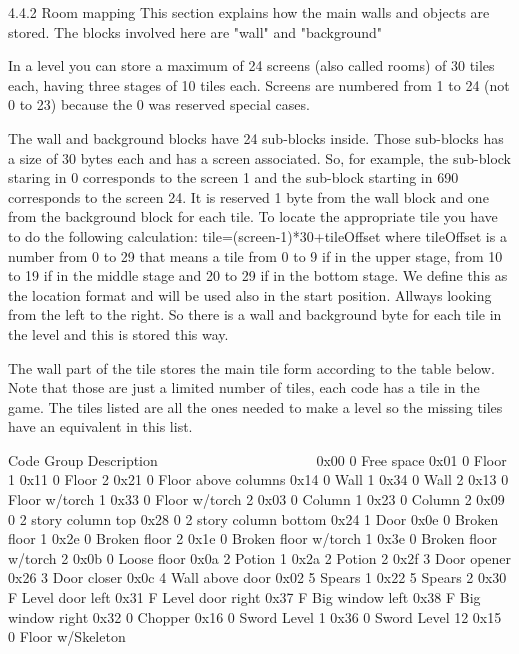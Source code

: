 4.4.2 Room mapping
 This section explains how the main walls and objects are stored. The
 blocks involved here are "wall" and "background"

 In a level you can store a maximum of 24 screens (also called rooms) of 30
 tiles each, having three stages of 10 tiles each. Screens are numbered from
 1 to 24 (not 0 to 23) because the 0 was reserved special cases.

 The wall and background blocks have 24 sub-blocks inside. Those sub-blocks
 has a size of 30 bytes each and has a screen associated. So, for example,
 the sub-block staring in 0 corresponds to the screen 1 and the sub-block
 starting in 690 corresponds to the screen 24. 
 It is reserved 1 byte from the wall block and one from the background block
 for each tile. To locate the appropriate tile you have to do the following
 calculation: tile=(screen-1)*30+tileOffset where tileOffset is a number
 from 0 to 29 that means a tile from 0 to 9 if in the upper stage, from
 10 to 19 if in the middle stage and 20 to 29 if in the bottom stage.
 We define this as the location format and will be used also in the start
 position.
 Allways looking from the left to the right.
 So there is a wall and background byte for each tile in the level and this
 is stored this way.

 The wall part of the tile stores the main tile form according to the table
 below. Note that those are just a limited number of tiles, each code has a
 tile in the game. The tiles listed are all the ones needed to make a level
 so the missing tiles have an equivalent in this list.

  Code Group Description
  ~~~~ ~~~~~ ~~~~~~~~~~~
  0x00 0     Free space
  0x01 0     Floor 1
  0x11 0     Floor 2
  0x21 0     Floor above columns
  0x14 0     Wall 1
  0x34 0     Wall 2
  0x13 0     Floor w/torch 1  
  0x33 0     Floor w/torch 2     
  0x03 0     Column 1   
  0x23 0     Column 2   
  0x09 0     2 story column top
  0x28 0     2 story column bottom
  0x24 1     Door
  0x0e 0     Broken floor 1
  0x2e 0     Broken floor 2
  0x1e 0     Broken floor w/torch 1
  0x3e 0     Broken floor w/torch 2
  0x0b 0     Loose floor
  0x0a 2     Potion 1
  0x2a 2     Potion 2    
  0x2f 3     Door opener
  0x26 3     Door closer
  0x0c 4     Wall above door
  0x02 5     Spears 1
  0x22 5     Spears 2
  0x30 F     Level door left
  0x31 F     Level door right
  0x37 F     Big window left
  0x38 F     Big window right
  0x32 0     Chopper
  0x16 0     Sword Level 1
  0x36 0     Sword Level 12
  0x15 0     Floor w/Skeleton
  
